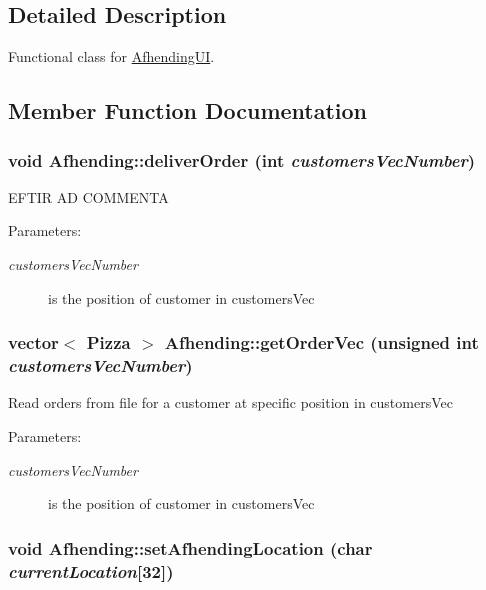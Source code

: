 \subsection{Detailed Description}
Functional class for \hyperlink{class_afhending_u_i}{Afhending\-UI}. 



\subsection{Member Function Documentation}
\hypertarget{class_afhending_b3cb078e2502d2eb7e6e67623cbe30b9}{
\subsubsection[deliverOrder]{\setlength{\rightskip}{0pt plus 5cm}void Afhending::deliver\-Order (int {\em customers\-Vec\-Number})}}
\label{class_afhending_b3cb078e2502d2eb7e6e67623cbe30b9}


EFTIR AD  COMMENTA

\begin{Desc}
\item[Parameters:]
\begin{description}
\item[{\em customers\-Vec\-Number}]is the position of customer in customers\-Vec \end{description}
\end{Desc}
\hypertarget{class_afhending_ad0cbeddec394b25c5eade57247f4110}{
\subsubsection[getOrderVec]{\setlength{\rightskip}{0pt plus 5cm}vector$<$ Pizza $>$ Afhending::get\-Order\-Vec (unsigned int {\em customers\-Vec\-Number})}}
\label{class_afhending_ad0cbeddec394b25c5eade57247f4110}


Read orders from file for a customer at specific position in customers\-Vec

\begin{Desc}
\item[Parameters:]
\begin{description}
\item[{\em customers\-Vec\-Number}]is the position of customer in customers\-Vec \end{description}
\end{Desc}
\hypertarget{class_afhending_411cc45b50d4a59a33d76f6c54e52f78}{
\subsubsection[setAfhendingLocation]{\setlength{\rightskip}{0pt plus 5cm}void Afhending::set\-Afhending\-Location (char {\em current\-Location}\mbox{[}32\mbox{]})}}
\label{class_afhending_411cc45b50d4a59a33d76f6c54e52f78}


